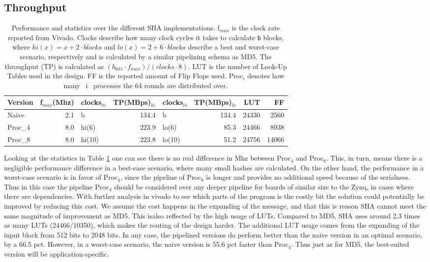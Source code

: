 \documentclass[a4paper, openany]{book}
\begin{document}
\subsection{Throughput}
\label{sec:org4119b2c}
\begin{table}[!htb]
\centering
\captionsetup{width=.8\linewidth}
\begin{tabular}{l r l r l r r r}
\hline
Version & f$_{max}$(Mhz) & clocks$_{hi}$ & TP(MBps)$_{hi}$ &clocks$_{lo}$ & TP(MBps)$_{lo}$ & LUT & FF\\
\hline
Naive    & 2.1 & b & 134.4 & b & 134.4 & 24330 & 2560\\
Proc_{4} & 8.0 & hi(6) & 223.9 & lo(6) & 85.3 & 24466 & 8938\\
Proc_{8} & 8.0 & hi(10) & 223.8 & lo(10) & 51.2 & 24756 & 14066\\
\end{tabular}
\caption[SHA256: FPGA Versions]%
{Performance and statistics over the different SHA implementations. f$_{max}$ is the clock rate reported from Vivado. Clocks describe how many clock cycles it takes to calculate \texttt{b} blocks, where $hi(x) = x+2 \cdot blocks$ and $lo(x) = 2 + 6 \cdot blocks$ describe a best and worst-case scenario, respectively and is calculated by a similar pipelining schema as MD5. The throughput (TP) is calculated as \((b_{bits}\cdot f_{max})/(clocks \cdot 8)\). LUT is the number of Look-Up Tables used in the design. FF is the reported amount of Flip Flops used. Proc$_{i}$ denotes how many ~i~ processes the 64 rounds are distributed over.}
\label{tab:SHAversions}
\end{table}
Looking at the statistics in Table \ref{tab:SHAversions} one can see there is no real difference in Mhz between Proc\(_4\) and Proc\(_8\). This, in turn, means there is a negligible performance difference in a best-case scenario, where many small hashes are calculated. On the other hand, the performance in a worst-case scenario is in favor of Proc\(_4\), since the pipeline of Proc\(_8\) is longer and provides no additional speed because of the serialness. Thus in this case the pipeline Proc\(_4\) should be considered over any deeper pipeline for boards of similar size to the Zynq, in cases where there are dependencies. With further analysis in vivado to see which parts of the program is the costly bit the solution could potentially be improved by reducing this cost. We assume the cost happens in the expanding of the message, and that this is reason SHA cannot meet the same magnitude of improvement as MD5. This isalso reflected by the high usage of LUTs. Compared to MD5, SHA uses around 2.3 times as many LUTs (24466/10350), which makes the routing of the design harder. The additional LUT usage comes from the expanding of the input block from 512 bits to 2048 bits. In any case, the pipelined versions do perform better than the naive version in an optimal scenario, by a 66.5 pct. However, in a worst-case scenario, the naive version is 55.6 pct faster than Proc\(_4\). Thus just as for MD5, the best-suited version will be application-specific.
\end{document}
